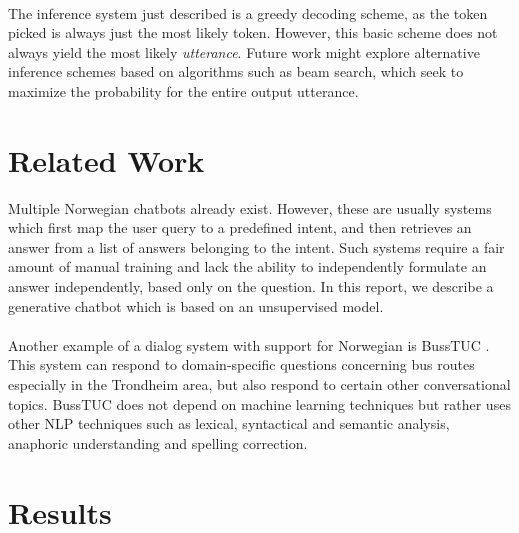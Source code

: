 \documentclass{article}
\begin{document}
\paragraph{}
The inference system just described is a greedy decoding scheme, as the token
picked is always just the most likely token. However, this basic scheme does
not always yield the most likely \emph{utterance}. Future work might explore
alternative inference schemes based on algorithms such as beam search, which
seek to maximize the probability for the entire output utterance.


\section*{Related Work}
Multiple Norwegian chatbots already exist. However, these are usually systems
which first map the user query to a predefined intent, and then retrieves an
answer from a list of answers belonging to the intent. Such systems require a
fair amount of manual training and lack the ability to independently formulate
an answer independently, based only on the question. In this report, we
describe a generative chatbot which is based on an unsupervised model.

\paragraph{}
Another example of a dialog system with support for Norwegian is BussTUC
\cite{buss-tuc}. This system can respond to domain-specific questions
concerning bus routes especially in the Trondheim area, but also respond to
certain other conversational topics. BussTUC does not depend on machine
learning techniques but rather uses other NLP techniques such as lexical,
syntactical and semantic analysis, anaphoric understanding and spelling
correction.

\section*{Results}
\end{document}
